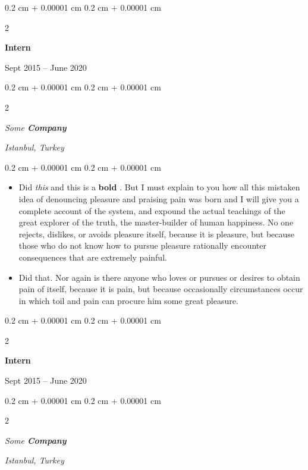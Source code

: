 \documentclass[10pt, letterpaper]{article}
\newenvironment{highlights}{
    \begin{itemize}[
        topsep=0.10 cm,
        parsep=0.10 cm,
        partopsep=0pt,
        itemsep=0pt,
        leftmargin=0.4 cm + 10pt
    ]
}{
    \end{itemize}
} %
\newenvironment{onecolentry}{
    \begin{adjustwidth}{
        0.2 cm + 0.00001 cm
    }{
        0.2 cm + 0.00001 cm
    }
}{
    \end{adjustwidth}
} %
\newenvironment{twocolentry}[2][]{
    \onecolentry
    \def\secondColumn{#2}
    \setcolumnwidth{\fill, 4.5 cm}
    \begin{paracol}{2}
}{
    \switchcolumn \raggedleft \secondColumn
    \end{paracol}
    \endonecolentry
} %
\let\hrefWithoutArrow\href
\renewcommand{\href}[2]{\hrefWithoutArrow{#1}{\ifthenelse{\equal{#2}{}}{ }{#2 }\raisebox{.15ex}{\footnotesize \faExternalLink*}}}
\begin{document}
        \vspace{0.2 cm}

                \begin{twocolentry}{
                    Sept 2015 – June 2020
                }
                \textbf{Intern}
                \end{twocolentry}
            \begin{twocolentry}{
        \textit{Istanbul, Turkey}    }
            \textit{Some \textbf{Company}}
            \end{twocolentry}

        \vspace{0.10 cm}
        \begin{onecolentry}
            \begin{highlights}
                \item Did \textit{this} and this is a \textbf{bold} \href{https://example.com}{link}. But I must explain to you how all this mistaken idea of denouncing pleasure and praising pain was born and I will give you a complete account of the system, and expound the actual teachings of the great explorer of the truth, the master-builder of human happiness. No one rejects, dislikes, or avoids pleasure itself, because it is pleasure, but because those who do not know how to pursue pleasure rationally encounter consequences that are extremely painful.
                \item Did that. Nor again is there anyone who loves or pursues or desires to obtain pain of itself, because it is pain, but because occasionally circumstances occur in which toil and pain can procure him some great pleasure.
            \end{highlights}
        \end{onecolentry}


        \vspace{0.2 cm}

                \begin{twocolentry}{
                    Sept 2015 – June 2020
                }
                \textbf{Intern}
                \end{twocolentry}
            \begin{twocolentry}{
        \textit{Istanbul, Turkey}    }
            \textit{Some \textbf{Company}}
            \end{twocolentry}
\end{document}
